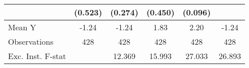 {\begin{tabular}{l*{5}{c}}
            &     (0.523)         &     (0.274)         &     (0.450)         &     (0.096)         &                     \\
\midrule
Mean Y      &       -1.24         &       -1.24         &        1.83         &        2.20         &       -1.24         \\
Observations&         428         &         428         &         428         &         428         &         428         \\
Exc. Inst. F-stat&                     &      12.369         &      15.993         &      27.033         &      26.893         \\
\bottomrule
\end{tabular}
}
